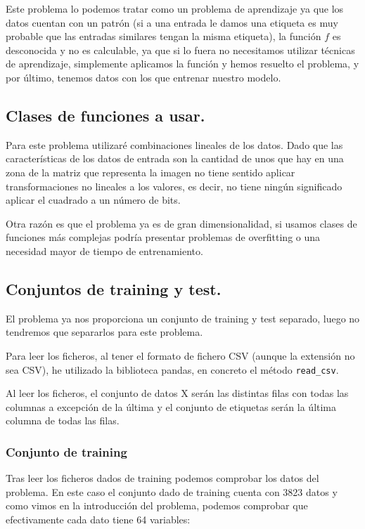 \documentclass[12pt, spanish]{article}
\begin{document}
Este problema lo podemos tratar como un problema de aprendizaje ya que los datos cuentan con un patrón (si a una entrada le damos una etiqueta es muy probable que las entradas similares tengan la misma etiqueta), la función $f$ es desconocida y no es calculable, ya que si lo fuera no necesitamos utilizar técnicas de aprendizaje, simplemente aplicamos la función y hemos resuelto el problema, y por último, tenemos datos con los que entrenar nuestro modelo.

\subsection{Clases de funciones a usar.}

Para este problema utilizaré combinaciones lineales de los datos. Dado que las características de los datos de entrada son la cantidad de unos que hay en una zona de la matriz que representa la imagen no tiene sentido aplicar transformaciones no lineales a los valores, es decir, no tiene ningún significado aplicar el cuadrado a un número de bits.

Otra razón es que el problema ya es de gran dimensionalidad, si usamos clases de funciones más complejas podría presentar problemas de overfitting o una necesidad mayor de tiempo de entrenamiento.

\subsection{Conjuntos de training y test.}

El problema ya nos proporciona un conjunto de training y test separado, luego no tendremos que separarlos para este problema.

Para leer los ficheros, al tener el formato de fichero CSV (aunque la extensión no sea CSV), he utilizado la biblioteca pandas, en concreto el método \texttt{read\_csv}.

Al leer los ficheros, el conjunto de datos X serán las distintas filas con todas las columnas a excepción de la última y el conjunto de etiquetas serán la última columna de todas las filas.

\subsubsection{Conjunto de training}

Tras leer los ficheros dados de training podemos comprobar los datos del problema. En este caso el conjunto dado de training cuenta con 3823 datos y como vimos en la introducción del problema, podemos comprobar que efectivamente cada dato tiene 64 variables:
\end{document}
